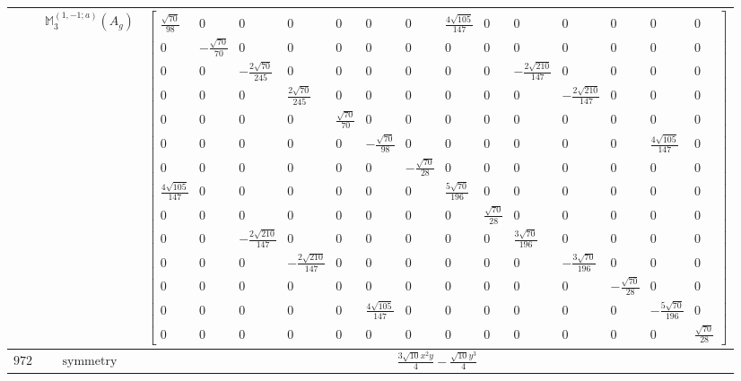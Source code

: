 \documentclass[fleqn,8pt,landscape]{jsarticle}
\begin{document}
\begin{longtable}{ccc}
$  $ & $ \mathbb{M}_{3}^{(1,-1;a)}(A_{g}) $ & $ \begin{bmatrix} \frac{\sqrt{70}}{98} & 0 & 0 & 0 & 0 & 0 & 0 & \frac{4 \sqrt{105}}{147} & 0 & 0 & 0 & 0 & 0 & 0 \\ 0 & - \frac{\sqrt{70}}{70} & 0 & 0 & 0 & 0 & 0 & 0 & 0 & 0 & 0 & 0 & 0 & 0 \\ 0 & 0 & - \frac{2 \sqrt{70}}{245} & 0 & 0 & 0 & 0 & 0 & 0 & - \frac{2 \sqrt{210}}{147} & 0 & 0 & 0 & 0 \\ 0 & 0 & 0 & \frac{2 \sqrt{70}}{245} & 0 & 0 & 0 & 0 & 0 & 0 & - \frac{2 \sqrt{210}}{147} & 0 & 0 & 0 \\ 0 & 0 & 0 & 0 & \frac{\sqrt{70}}{70} & 0 & 0 & 0 & 0 & 0 & 0 & 0 & 0 & 0 \\ 0 & 0 & 0 & 0 & 0 & - \frac{\sqrt{70}}{98} & 0 & 0 & 0 & 0 & 0 & 0 & \frac{4 \sqrt{105}}{147} & 0 \\ 0 & 0 & 0 & 0 & 0 & 0 & - \frac{\sqrt{70}}{28} & 0 & 0 & 0 & 0 & 0 & 0 & 0 \\ \frac{4 \sqrt{105}}{147} & 0 & 0 & 0 & 0 & 0 & 0 & \frac{5 \sqrt{70}}{196} & 0 & 0 & 0 & 0 & 0 & 0 \\ 0 & 0 & 0 & 0 & 0 & 0 & 0 & 0 & \frac{\sqrt{70}}{28} & 0 & 0 & 0 & 0 & 0 \\ 0 & 0 & - \frac{2 \sqrt{210}}{147} & 0 & 0 & 0 & 0 & 0 & 0 & \frac{3 \sqrt{70}}{196} & 0 & 0 & 0 & 0 \\ 0 & 0 & 0 & - \frac{2 \sqrt{210}}{147} & 0 & 0 & 0 & 0 & 0 & 0 & - \frac{3 \sqrt{70}}{196} & 0 & 0 & 0 \\ 0 & 0 & 0 & 0 & 0 & 0 & 0 & 0 & 0 & 0 & 0 & - \frac{\sqrt{70}}{28} & 0 & 0 \\ 0 & 0 & 0 & 0 & 0 & \frac{4 \sqrt{105}}{147} & 0 & 0 & 0 & 0 & 0 & 0 & - \frac{5 \sqrt{70}}{196} & 0 \\ 0 & 0 & 0 & 0 & 0 & 0 & 0 & 0 & 0 & 0 & 0 & 0 & 0 & \frac{\sqrt{70}}{28} \end{bmatrix} $ \\ \hline
$ 972 $ & $ \text{symmetry} $ & $ \frac{3 \sqrt{10} x^{2} y}{4} - \frac{\sqrt{10} y^{3}}{4} $ \\

\end{longtable}
\end{document}

